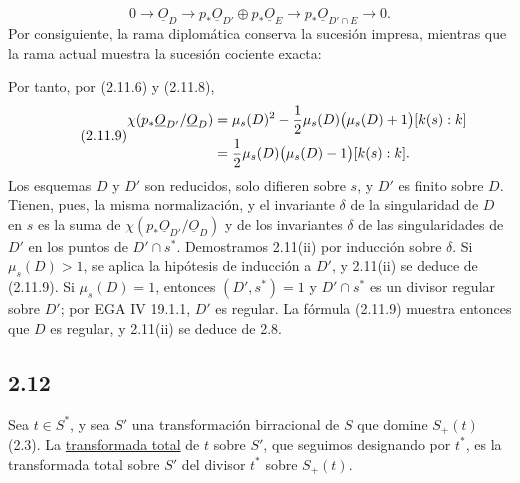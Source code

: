 \begin{equation*}
0\longrightarrow\underline{O}_D
\longrightarrow p_*\underline{O}_{D'}\oplus p_*\underline{O}_E
\longrightarrow p_*\underline{O}_{D'\cap E}
\longrightarrow0.
\end{equation*}
Por consiguiente, la rama diplomática conserva la sucesión impresa, mientras
que la rama actual muestra la sucesión cociente exacta:

\pageoriginale

Por tanto, por (2.11.6) y (2.11.8),
\begin{equation}\tag{2.11.9}
\begin{aligned}
\chi(p_*\underline{O}_{D'}/\underline{O}_D)
&=\sisi{\frac12\mu_s(D)\bigl(\mu_s(D)+1\bigr)-\mu_s(D)^2}
{\mu_s(D)^2-\frac12\mu_s(D)\bigl(\mu_s(D)+1\bigr)}[k(s):k]\\
&=\frac12\mu_s(D)\bigl(\mu_s(D)-1\bigr)[k(s):k].
\end{aligned}
\end{equation}
Los esquemas $D$ y $D'$ son reducidos, solo difieren sobre $s$, y $D'$ es finito
sobre $D$. Tienen, pues, la misma normalización, y el invariante $\delta$ de la
singularidad de $D$ en $s$ es la suma de
$\chi(p_*\underline{O}_{D'}/\underline{O}_D)$ y de los invariantes $\delta$ de
las singularidades de $D'$ en los puntos de $D'\cap s^*$. Demostramos 2.11(ii)
por inducción sobre $\delta$. Si $\mu_s(D)>1$, se aplica la hipótesis de
inducción a $D'$, y 2.11(ii) se deduce de (2.11.9). Si $\mu_s(D)=1$, entonces
$(D',s^*)=1$ y $D'\cap s^*$ es un divisor regular sobre $D'$; por EGA IV 19.1.1,
$D'$ es regular. La fórmula (2.11.9) muestra entonces que $D$ es regular, y
2.11(ii) se deduce de 2.8.

\subsection*{2.12}
Sea $t\in S^*$, y sea $S'$ una transformación birracional de $S$ que domine
$S_+(t)$ (2.3). La \underline{transformada total} de $t$ sobre $S'$, que
seguimos designando por $t^*$, es la transformada total sobre $S'$ del divisor
$t^*$ sobre $S_+(t)$.

